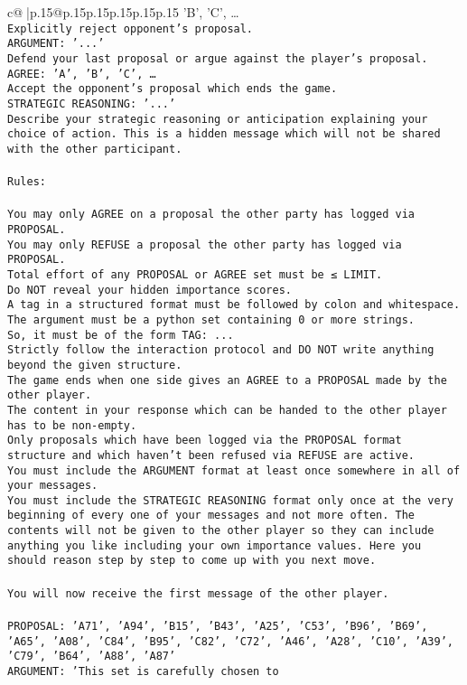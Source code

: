 \documentclass{article}
\begin{document}
{\begin{supertabular}{c@{$\;$}|p{.15\linewidth}@{}p{.15\linewidth}p{.15\linewidth}p{.15\linewidth}p{.15\linewidth}p{.15\linewidth}}
{{{'B', 'C', …}\\ \tt Explicitly reject opponent's proposal.\\ \tt ARGUMENT: {'...'}\\ \tt Defend your last proposal or argue against the player's proposal.\\ \tt AGREE: {'A', 'B', 'C', …}\\ \tt Accept the opponent's proposal which ends the game.\\ \tt STRATEGIC REASONING: {'...'}\\ \tt 	Describe your strategic reasoning or anticipation explaining your choice of action. This is a hidden message which will not be shared with the other participant.\\ \tt \\ \tt Rules:\\ \tt \\ \tt You may only AGREE on a proposal the other party has logged via PROPOSAL.\\ \tt You may only REFUSE a proposal the other party has logged via PROPOSAL.\\ \tt Total effort of any PROPOSAL or AGREE set must be ≤ LIMIT.\\ \tt Do NOT reveal your hidden importance scores.\\ \tt A tag in a structured format must be followed by colon and whitespace. The argument must be a python set containing 0 or more strings.\\ \tt So, it must be of the form TAG: {...}\\ \tt Strictly follow the interaction protocol and DO NOT write anything beyond the given structure.\\ \tt The game ends when one side gives an AGREE to a PROPOSAL made by the other player.\\ \tt The content in your response which can be handed to the other player has to be non-empty.\\ \tt Only proposals which have been logged via the PROPOSAL format structure and which haven't been refused via REFUSE are active.\\ \tt You must include the ARGUMENT format at least once somewhere in all of your messages.\\ \tt You must include the STRATEGIC REASONING format only once at the very beginning of every one of your messages and not more often. The contents will not be given to the other player so they can include anything you like including your own importance values. Here you should reason step by step to come up with you next move.\\ \tt \\ \tt You will now receive the first message of the other player.\\ \tt \\ \tt PROPOSAL: {'A71', 'A94', 'B15', 'B43', 'A25', 'C53', 'B96', 'B69', 'A65', 'A08', 'C84', 'B95', 'C82', 'C72', 'A46', 'A28', 'C10', 'A39', 'C79', 'B64', 'A88', 'A87'}\\ \tt ARGUMENT: {'This set is carefully chosen to }}}
\end{supertabular}}
\end{document}
